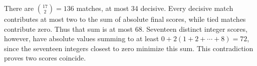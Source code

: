 There are $\binom{17}2=136$ matches, at most 34 decisive. Every decisive match contributes at most two to the sum of absolute final scores, while tied matches contribute zero. Thus that sum is at most 68. Seventeen distinct integer scores, however, have absolute values summing to at least $0+2(1+2+\cdots+8)=72$, since the seventeen integers closest to zero minimize this sum. This contradiction proves two scores coincide.
